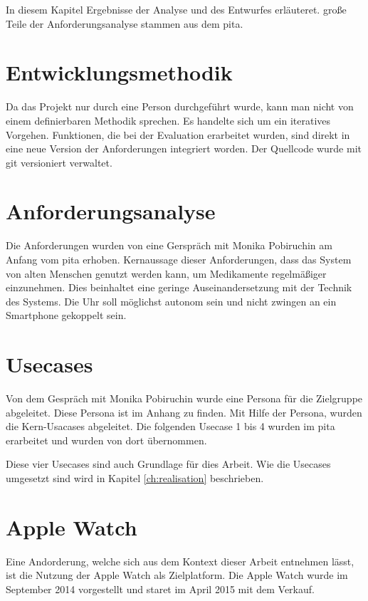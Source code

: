 In diesem Kapitel Ergebnisse der Analyse und des Entwurfes erläuteret. große Teile der Anforderungsanalyse stammen aus dem \gls{pita}.
\section{Entwicklungsmethodik}
Da das Projekt nur durch eine Person durchgeführt wurde, kann man nicht von einem definierbaren Methodik sprechen. Es handelte sich um ein iteratives Vorgehen. Funktionen, die bei der Evaluation erarbeitet wurden, sind direkt in eine neue Version der Anforderungen integriert worden. Der Quellcode wurde mit \gls{git} versioniert verwaltet.
\section{Anforderungsanalyse}
Die Anforderungen wurden von eine Gerspräch mit Monika Pobiruchin am Anfang vom \gls{pita} erhoben. Kernaussage dieser Anforderungen, dass das System von alten Menschen genutzt werden kann, um Medikamente regelmäßiger einzunehmen. Dies beinhaltet eine geringe Auseinandersetzung mit der Technik des Systems. Die Uhr soll möglichst autonom sein und nicht zwingen an ein Smartphone gekoppelt sein.

\section{Usecases} 
Von dem Gespräch mit Monika Pobiruchin wurde eine Persona für die Zielgruppe abgeleitet. Diese Persona ist im Anhang zu finden.
Mit Hilfe der Persona, wurden die Kern-Usacases abgeleitet. Die folgenden Usecase 1 bis 4 wurden im \gls{pita} erarbeitet und wurden von dort übernommen. 

Diese vier Usecases sind auch Grundlage für dies Arbeit. Wie die Usecases umgesetzt sind wird in Kapitel \ref{ch:realisation} beschrieben.

\section{Apple Watch}
\label{ch:apple-watch}
Eine Andorderung, welche sich aus dem Kontext dieser Arbeit entnehmen lässt, ist die Nutzung der Apple Watch als Zielplatform. Die Apple Watch wurde im September 2014 vorgestellt und staret im April 2015 mit dem Verkauf.
